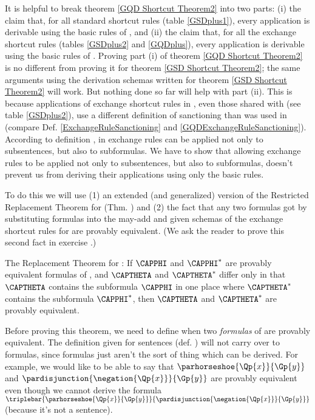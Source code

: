 It is helpful to break theorem \ref{GQD Shortcut Theorem2} into two parts: (i) the claim that, for all standard shortcut rules (table \ref{GSDplus1}), every application is derivable using the basic rules of \GQD{}, and (ii) the claim that, for all the exchange shortcut rules (tables \ref{GSDplus2} and \ref{GQDplus}), every application is derivable using the basic rules of \GQD{}. 
Proving part (i) of theorem \ref{GQD Shortcut Theorem2} is no different from proving it for theorem \ref{GSD Shortcut Theorem2}; the same arguments using the derivation schemas written for theorem \ref{GSD Shortcut Theorem2} will work.
But nothing done so far will help with part (ii).
This is because applications of exchange shortcut rules in \GQDP{}, even those shared with \GSDP{} (see table \ref{GSDplus2}), use a different definition of sanctioning than was used in \GSDP{} (compare Def. \ref{ExchangeRuleSanctioning} and \ref{GQDExchangeRuleSanctioning}). 
According to definition , in \GQDP{} exchange rules can be applied not only to subsentences, but also to subformulas. 
We have to show that allowing exchange rules to be applied not only to subsentences, but also to subformulas, doesn't prevent us from deriving their applications using only the basic rules.

To do this we will use (1) an extended (and generalized) version of the Restricted Replacement Theorem for \GSD{} (Thm. ) and (2) the fact that any two formulas got by substituting \GQL{} formulas into the may-add and given schemas of the exchange shortcut rules for \GQD{} are provably equivalent. 
(We ask the reader to prove this second fact in exercise .)
\begin{THEOREM}{ The Replacement Theorem for \GQD{}:}
If $\CAPPHI$ and $\CAPPHI^*$ are provably equivalent formulas of \GQL{}, and $\CAPTHETA$ and $\CAPTHETA^*$ differ only in that $\CAPTHETA$ contains the subformula $\CAPPHI$ in one place where $\CAPTHETA^*$ contains the subformula $\CAPPHI^*$, then $\CAPTHETA$ and $\CAPTHETA^*$ are provably equivalent.
\end{THEOREM}
\noindent{}Before proving this theorem, we need to define when two \emph{formulas} of \GQL{} are provably equivalent. 
The definition given for \GSL{} sentences (def. ) will not carry over to \GQL{} formulas, since formulas just aren't the sort of thing which can be derived. 
For example, we would like to be able to say that $\parhorseshoe{\Qp{\variable{x}}}{\Gp{\variable{y}}}$ and $\pardisjunction{\negation{\Qp{\variable{x}}}}{\Gp{\variable{y}}}$ are provably equivalent even though we cannot derive the formula $\triplebar{\parhorseshoe{\Qp{\variable{x}}}{\Gp{\variable{y}}}}{\pardisjunction{\negation{\Qp{\variable{x}}}}{\Gp{\variable{y}}}}$ (because it's not a sentence). 

